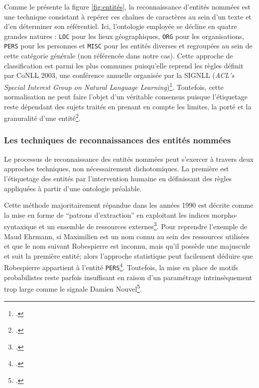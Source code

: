     Comme le présente la figure \ref{fig:entités}, la reconnaissance d'entités nommées est une technique consistant à repérer ces chaînes de caractères au sein d'un texte et d'en déterminer son référentiel. Ici, l'ontologie employée se décline en quatre grandes natures : \texttt{LOC} pour les lieux géographiques, \texttt{ORG} pour les organisations, \texttt{PERS} pour les personnes et \texttt{MISC} pour les entités diverses et regroupées au sein de cette catégorie générale (non référencée dans notre cas). Cette approche de classification est parmi les plus communes puisqu'elle reprend les règles définit par CoNLL 2003, une conférence annuelle organisée par la SIGNLL (\textit{ACL's Special Interest Group on Natural Language Learning})\footcite{lemmensCoNLL2022CoNLL2022}. Toutefois, cette normalisation ne peut faire l'objet d'un véritable consensus puisque l'étiquetage reste dépendant des sujets traités en prenant en compte les limites, la porté et la granuralité d'une entité\footcite{hengchenExtractionEntitesNommees2015}.
    
    \subsubsection{Les techniques de reconnaissances des entités nommées}
    
    Le processus de reconnaissance des entités nommées peut s'exercer à travers deux approches techniques, non nécessairement dichotomiques. La première est l'étiquetage des entités par l'intervention humaine en définissant des règles appliquées à partir d'une ontologie préalable. 
    
    Cette méthode majoritairement répandue dans les années 1990 est décrite comme la mise en forme de \enquote{patrons d'extraction} en exploitant les indices morpho-syntaxique et un ensemble de ressources externes\footcite[p.~32]{ehrmannEntiteesNommeesLinguistique2008}. Pour reprendre l'exemple de Maud Ehrmann, si Maximilien est un nom connu au sein des ressources utilisées et que le nom suivant Robespierre est inconnu, mais qu'il possède une majuscule et suit la première entité; alors l'approche statistique peut facilement déduire que Robespierre appartient à l'entité \texttt{PERS}\footcite[p.~33]{ehrmannEntiteesNommeesLinguistique2008}. Toutefois, la mise en place de motifs probabilistes reste parfois insuffisant en raison d'un paramétrage intrinsèquement trop large comme le signale Damien Nouvel\footcite[p.~146]{nouvelReconnaissanceEntitesNommees2012}.
    
